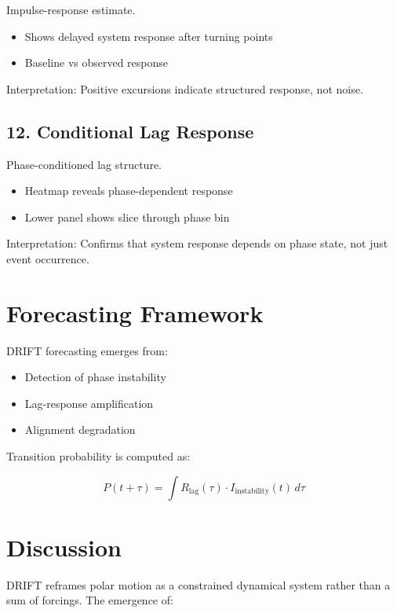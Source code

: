 \documentclass[11pt]{article}
\begin{document}
Impulse-response estimate.

\begin{itemize}
\item Shows delayed system response after turning points
\item Baseline vs observed response
\end{itemize}

Interpretation:
Positive excursions indicate structured response, not noise.

\subsection{12. Conditional Lag Response}

Phase-conditioned lag structure.

\begin{itemize}
\item Heatmap reveals phase-dependent response
\item Lower panel shows slice through phase bin
\end{itemize}

Interpretation:
Confirms that system response depends on phase state, not just event occurrence.

\section{Forecasting Framework}

DRIFT forecasting emerges from:

\begin{itemize}
\item Detection of phase instability
\item Lag-response amplification
\item Alignment degradation
\end{itemize}

Transition probability is computed as:

\begin{equation}
P(t+\tau) = \int R_{\text{lag}}(\tau) \cdot I_{\text{instability}}(t) \, d\tau
\end{equation}

\section{Discussion}

DRIFT reframes polar motion as a constrained dynamical system rather than a sum of forcings. The emergence of:
\end{document}
